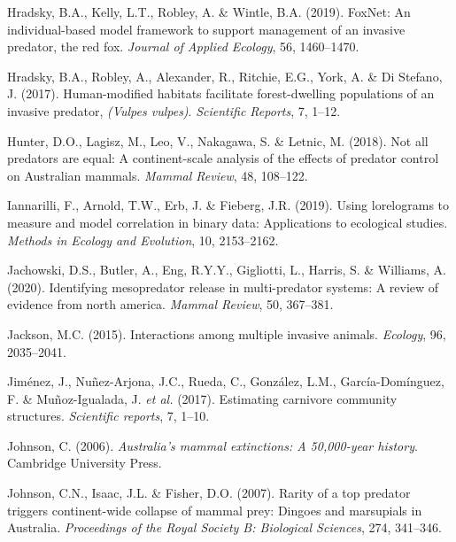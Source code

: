 \documentclass[11pt,a4paper,titlepage,twoside,openright]{style/unimelbthesis}
\begin{document}
\begin{mainmatter}
\leavevmode\hypertarget{ref-hradsky2019foxnet}{}%
Hradsky, B.A., Kelly, L.T., Robley, A. \& Wintle, B.A. (2019). FoxNet: An individual-based model framework to support management of an invasive predator, the red fox. \emph{Journal of Applied Ecology}, 56, 1460--1470.

\leavevmode\hypertarget{ref-hradsky2017human}{}%
Hradsky, B.A., Robley, A., Alexander, R., Ritchie, E.G., York, A. \& Di Stefano, J. (2017). Human-modified habitats facilitate forest-dwelling populations of an invasive predator, \emph{(Vulpes vulpes)}. \emph{Scientific Reports}, 7, 1--12.

\leavevmode\hypertarget{ref-hunter2018not}{}%
Hunter, D.O., Lagisz, M., Leo, V., Nakagawa, S. \& Letnic, M. (2018). Not all predators are equal: A continent-scale analysis of the effects of predator control on Australian mammals. \emph{Mammal Review}, 48, 108--122.

\leavevmode\hypertarget{ref-iannarilli2019lorelograms}{}%
Iannarilli, F., Arnold, T.W., Erb, J. \& Fieberg, J.R. (2019). Using lorelograms to measure and model correlation in binary data: Applications to ecological studies. \emph{Methods in Ecology and Evolution}, 10, 2153--2162.

\leavevmode\hypertarget{ref-jachowski2020identifying}{}%
Jachowski, D.S., Butler, A., Eng, R.Y.Y., Gigliotti, L., Harris, S. \& Williams, A. (2020). Identifying mesopredator release in multi-predator systems: A review of evidence from north america. \emph{Mammal Review}, 50, 367--381.

\leavevmode\hypertarget{ref-jackson2015interactions}{}%
Jackson, M.C. (2015). Interactions among multiple invasive animals. \emph{Ecology}, 96, 2035--2041.

\leavevmode\hypertarget{ref-jimenez2017estimating}{}%
Jiménez, J., Nuñez-Arjona, J.C., Rueda, C., González, L.M., García-Domínguez, F. \& Muñoz-Igualada, J. \emph{et al.} (2017). Estimating carnivore community structures. \emph{Scientific reports}, 7, 1--10.

\leavevmode\hypertarget{ref-johnson2006australia}{}%
Johnson, C. (2006). \emph{Australia's mammal extinctions: A 50,000-year history}. Cambridge University Press.

\leavevmode\hypertarget{ref-johnson2007rarity}{}%
Johnson, C.N., Isaac, J.L. \& Fisher, D.O. (2007). Rarity of a top predator triggers continent-wide collapse of mammal prey: Dingoes and marsupials in Australia. \emph{Proceedings of the Royal Society B: Biological Sciences}, 274, 341--346.


\end{mainmatter}
\end{document}
